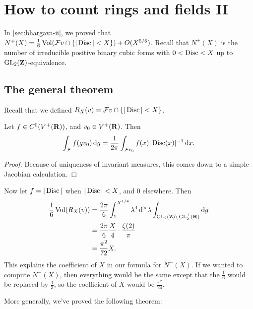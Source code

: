 
\section{How to count rings and fields II}\label{sec:bhargava-iii}





In \autoref{sec:bhargava-ii}, we proved that 
$N^+(X) = \frac 1 6 \operatorname{Vol}(\mathcal{F} v\cap \{|\operatorname{Disc}|<X\}) + O(X^{5/6})$. 
Recall that $N^+(X)$ is the number of irreducible positive binary cubic forms 
with $0<\operatorname{Disc}<X$ up to $\operatorname{GL}_2(\mathbf{Z})$-equivalence. 






\subsection{The general theorem}

Recall that we defined $R_X(v) = \mathcal{F} v\cap \{|\operatorname{Disc}|<X\}$. 

\begin{prop}
Let $f\in C^0(V^+(\mathbf{R}))$, and $v_0\in V^+(\mathbf{R})$. Then 
\[
  \int_{\mathcal{F}} f(g v_0)\, \mathrm{d}g = \frac{1}{2\pi} \int_{\mathcal{F} v_0} f(x)|\operatorname{Disc}(x)|^{-1} \, \mathrm{d}x . 
\]
\end{prop}
\begin{proof}
Because of uniqueness of invariant measures, this comes down to a simple 
Jacobian calculation. 
\end{proof}

Now let $f=|\operatorname{Disc}|$ when $|\operatorname{Disc}|<X$, and $0$ elsewhere. Then 
\begin{align*}
  \frac 1 6 \operatorname{Vol}(R_X(v)) 
    &= \frac{2\pi}{6} \int_1^{X^{1/4}} \lambda^4\, \mathrm{d}^\times \lambda \int_{\operatorname{GL}_2(\mathbf{Z})\backslash \operatorname{GL}_2^\pm(\mathbf{R})} \mathrm{d} g \\
    &= \frac{2\pi}{6} \frac{X}{4} \cdot \frac{\zeta(2)}{\pi} \\
    &= \frac{\pi^2}{72} X.
\end{align*}
This explains the coefficient of $X$ in our formula for $N^+(X)$. If we wanted 
to compute $N^-(X)$, then everything would be the same except that the 
$\frac 1 6$ would be replaced by $\frac 1 3$, so the coefficient of $X$ would 
be $\frac{\pi^2}{24}$. 

More generally, we've proved the following theorem: 

